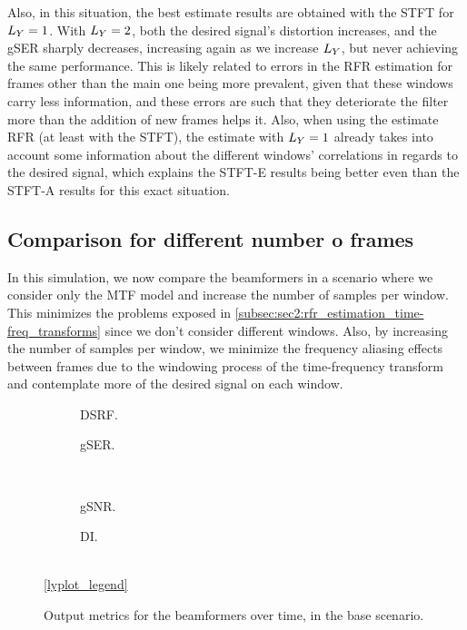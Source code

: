 Also, in this situation, the best estimate results are obtained with the STFT for $\Ly = 1$. With $\Ly = 2$, both the desired signal's distortion increases, and the gSER sharply decreases, increasing again as we increase $\Ly$, but never achieving the same performance. This is likely related to errors in the RFR estimation for frames other than the main one being more prevalent, given that these windows carry less information, and these errors are such that they deteriorate the filter more than the addition of new frames helps it. Also, when using the estimate RFR (at least with the STFT), the estimate with $\Ly = 1$ already takes into account some information about the different windows' correlations in regards to the desired signal, which explains the STFT-E results being better even than the STFT-A results for this exact situation.


\subsection{Comparison for different number o frames}

In this simulation, we now compare the beamformers in a scenario where we consider only the MTF model and increase the number of samples per window. This minimizes the problems exposed in \cref{subsec:sec2:rfr_estimation_time-freq_transforms} since we don't consider different windows. Also, by increasing the number of samples per window, we minimize the frequency aliasing effects between frames due to the windowing process of the time-frequency transform and contemplate more of the desired signal on each window.
\begin{figure}[!ht]
	\centering
	\begin{subfigure}{0.49\textwidth}
		\centering
		
		\caption{DSRF.}
		\label{subfig:lineplot__DSRF__N_var__iSER_n15__Ly_1}
	\end{subfigure}\hfill
	\begin{subfigure}{0.49\textwidth}
		\centering
		
		\caption{gSER.}
		\label{subfig:lineplot__gSER__N_var__iSER_n15__Ly_1}
	\end{subfigure}\\[1em]
	\begin{subfigure}{0.49\textwidth}
		\centering
		
		\caption{gSNR.}
		\label{subfig:lineplot__gSNR__N_var__iSER_n15__Ly_1}
	\end{subfigure}\hfill
	\begin{subfigure}{0.49\textwidth}
		\centering
		
		\caption{DI.}
		\label{subfig:lineplot__DI__N_var__iSER_n15__Ly_1}
	\end{subfigure}\\[1em]
	\ref*{lyplot_legend}
	\caption{Output metrics for the beamformers over time, in the base scenario.}
	\label{fig:lineplot__N_var__iSER_n15__Ly_1}
\end{figure}

